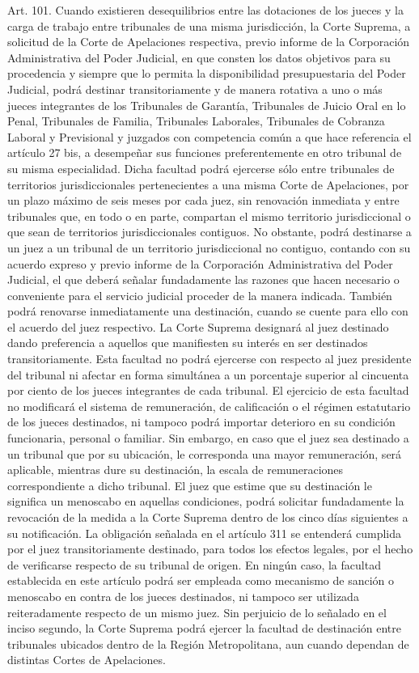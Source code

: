     Art. 101. Cuando existieren desequilibrios entre las dotaciones de los jueces y la carga de trabajo entre tribunales de una misma jurisdicción, la Corte Suprema, a solicitud de la Corte de Apelaciones respectiva, previo informe de la Corporación Administrativa del Poder Judicial, en que consten los datos objetivos para su procedencia y siempre que lo permita la disponibilidad presupuestaria del Poder Judicial, podrá destinar transitoriamente y de manera rotativa a uno o más jueces integrantes de los Tribunales de Garantía, Tribunales de Juicio Oral en lo Penal, Tribunales de Familia, Tribunales Laborales, Tribunales de Cobranza Laboral y Previsional y juzgados con competencia común a que hace referencia el artículo 27 bis, a desempeñar sus funciones preferentemente en otro tribunal de su misma especialidad.
    Dicha facultad podrá ejercerse sólo entre tribunales de territorios jurisdiccionales pertenecientes a una misma Corte de Apelaciones, por un plazo máximo de seis meses por cada juez, sin renovación inmediata y entre tribunales que, en todo o en parte, compartan el mismo territorio jurisdiccional o que sean de territorios jurisdiccionales contiguos.
    No obstante, podrá destinarse a un juez a un tribunal de un territorio jurisdiccional no contiguo, contando con su acuerdo expreso y previo informe de la Corporación Administrativa del Poder Judicial, el que deberá señalar fundadamente las razones que hacen necesario o conveniente para el servicio judicial proceder de la manera indicada. También podrá renovarse inmediatamente una destinación, cuando se cuente para ello con el acuerdo del juez respectivo.
    La Corte Suprema designará al juez destinado dando preferencia a aquellos que manifiesten su interés en ser destinados transitoriamente.
    Esta facultad no podrá ejercerse con respecto al juez presidente del tribunal ni afectar en forma simultánea a un porcentaje superior al cincuenta por ciento de los jueces integrantes de cada tribunal.
    El ejercicio de esta facultad no modificará el sistema de remuneración, de calificación o el régimen estatutario de los jueces destinados, ni tampoco podrá importar deterioro en su condición funcionaria, personal o familiar. Sin embargo, en caso que el juez sea destinado a un tribunal que por su ubicación, le corresponda una mayor remuneración, será aplicable, mientras dure su destinación, la escala de remuneraciones correspondiente a dicho tribunal. El juez que estime que su destinación le significa un menoscabo en aquellas condiciones, podrá solicitar fundadamente la revocación de la medida a la Corte Suprema dentro de los cinco días siguientes a su notificación.
    La obligación señalada en el artículo 311 se entenderá cumplida por el juez transitoriamente destinado, para todos los efectos legales, por el hecho de verificarse respecto de su tribunal de origen.
    En ningún caso, la facultad establecida en este artículo podrá ser empleada como mecanismo de sanción o menoscabo en contra de los jueces destinados, ni tampoco ser utilizada reiteradamente respecto de un mismo juez.
    Sin perjuicio de lo señalado en el inciso segundo, la Corte Suprema podrá ejercer la facultad de destinación entre tribunales ubicados dentro de la Región Metropolitana, aun cuando dependan de distintas Cortes de Apelaciones.


